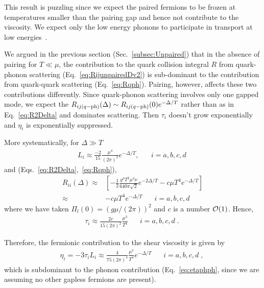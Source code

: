 \documentclass[10pt, aps, prd, superscriptaddress, nofootinbib, 
               amsmath, amssymb, twocolumn,
               preprintnumbers, showpacs,
               raggedbottom,
               floatfix]{revtex4-1}
\begin{document}
This result is puzzling since we expect the paired fermions to be frozen
at temperatures smaller than the pairing gap and hence not contribute to the
viscosity.  We expect only the low energy phonons to participate in transport
at low energies~\cite{Rupak:2007vp}. 

We argued in the previous section (Sec.~\ref{subsec:Unpaired}) that in the absence of
pairing for $T\ll\mu$, the contribution to the quark collision integral $R$
from quark-phonon scattering (Eq.~\ref{eq:RijunpairedDv2}) is sub-dominant to the
contribution from quark-quark scattering (Eq.~\ref{eq:Rqph}). Pairing, however, 
affects these two contributions differently. Since quark-phonon scattering involves only one gapped mode, we expect the
$R_{ij(q-{\rm{ph}})}(\Delta)\sim R_{ij(q-{\rm{ph}})}(0)e^{-\Delta/T}$ rather
than as in Eq.~\ref{eq:R2Delta} and dominates scattering. Then $\tau_i$ doesn't
grow exponentially and $\eta_i$ is exponentially suppressed.

More systematically, for $\Delta\gg T$
\begin{equation}
\begin{split}
L_i\approx \frac{-2}{15} \frac{\mu^4}{(2\pi)^2} 
e^{-\Delta/T},\;\;\;\;\;\; {i=a,b,c,d}~\label{eq:LDeltav2}
\end{split}
\end{equation}
and (Eqs.~\ref{eq:R2Delta},~\ref{eq:Rqph}),
\begin{equation}
\begin{split}
R_{ii}(\Delta)\approx&  [-\frac{1}{2}\frac{g^3T^2\mu^3\nu}{640 \pi\sqrt{2}}
e^{-2\Delta/T}- c\mu T^4 e^{-\Delta/T}]\\
\approx&- c\mu T^4 e^{-\Delta/T}\;\;\;\;\;\; {i=a,b,c,d}~\label{eq:RDelta}
\end{split}
\end{equation}
where we have taken $\Pi_l(0)=(g\mu/(2\pi))^2$ and $c$ is a number 
${\cal{O}}(1)$. Hence, 
\begin{equation}
\begin{split}
\tau_i\approx \frac{2c}{15(2\pi)^2}\frac{\mu^3}{T^4}\;\;\;\;\;\; {i=a,b,c,d}\;.
~\label{eq:tauph}
\end{split}
\end{equation}

Therefore, the fermionic contribution to the shear viscosity is given by
\begin{equation}
\begin{split}
\eta_i=-3\tau_iL_i\approx
\frac{4}{75(2\pi)^4}\frac{\mu^7}{T^4}e^{-\Delta/T}
\;\;\;\;\;\; {i=a,b,c,d}\;,~\label{eq:etagappedWphonons} 
\end{split}
\end{equation}
which is subdominant to the phonon contribution (Eq.~\ref{eq:etaphph}, since we
are assuming no other gapless fermions are present).
\end{document}
